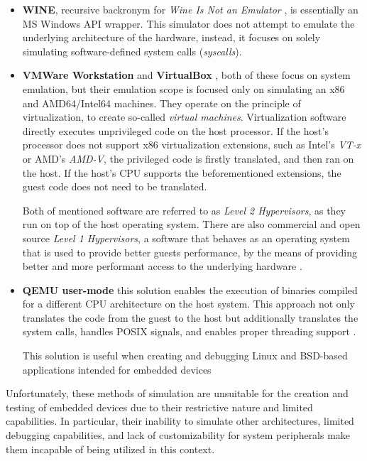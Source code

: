 \begin{itemize}
	\item{\textbf{WINE}, recursive backronym for \textit{Wine Is Not an Emulator} \cite{Wine}, is essentially an MS
	Windows API wrapper. This simulator does not attempt to emulate the underlying architecture of the hardware,
	instead, it focuses on solely simulating software-defined system calls (\textit{syscalls}).}
	\item{\textbf{VMWare Workstation} \cite{VMWareWorkstation} and \textbf{VirtualBox} \cite{VirtualBox}, both of these
	focus on system emulation, but their emulation scope is focused only on simulating an x86 and AMD64/Intel64 machines.
	They operate on the principle of virtualization, to create so-called \textit{virtual machines}. Virtualization
	software directly executes unprivileged code on the host processor. If the host's processor does not support
	x86 virtualization extensions, such as Intel's \textit{VT-x} or AMD's \textit{AMD-V}, the privileged code is firstly
	translated, and then ran on the host. If the host's CPU supports the beforementioned extensions, the guest code does
	not need to be translated.

	Both of mentioned software are referred to as \textit{Level 2 Hypervisors}, as they run on top of the host
	operating system. There are also commercial and open source \textit{Level 1 Hypervisors}, a software that behaves
	as an operating system that is used to provide better guests performance, by the means of providing better and more
	performant access to the underlying hardware \cite{Graniszewski_Waldemar_Performance_2016}.}
	\item{\textbf{QEMU user-mode} this solution enables the execution of binaries compiled for a different CPU
	architecture on the host system. This approach not only translates the code from the guest to the host but
	additionally translates the system calls, handles POSIX signals, and enables proper threading support
	\cite{QemuUser}.

	This solution is useful when creating and debugging Linux and BSD-based applications intended for embedded devices}
\end{itemize}

Unfortunately, these methods of simulation are unsuitable for the creation and testing of embedded devices due to their
restrictive nature and limited capabilities. In particular, their inability to simulate other architectures, limited
debugging capabilities, and lack of customizability for system peripherals make them incapable of being utilized in this
context.

